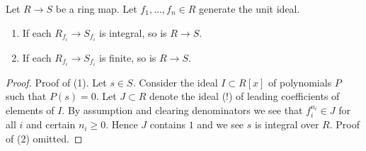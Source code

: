 \begin{lemma}
\label{lemma-integral-local}
Let $R \to S$ be a ring map.
Let $f_1, \ldots, f_n \in R$ generate the unit ideal.
\begin{enumerate}
\item If each $R_{f_i} \to S_{f_i}$ is integral, so is $R \to S$.
\item If each $R_{f_i} \to S_{f_i}$ is finite, so is $R \to S$.
\end{enumerate}
\end{lemma}

\begin{proof}
Proof of (1).
Let $s \in S$. Consider the ideal $I \subset R[x]$ of
polynomials $P$ such that $P(s) = 0$. Let $J \subset R$
denote the ideal (!) of leading coefficients of elements of $I$.
By assumption and clearing denominators
we see that $f_i^{n_i} \in J$ for all $i$
and certain $n_i \geq 0$. Hence $J$ contains $1$ and we see
$s$ is integral over $R$. Proof of (2) omitted.
\end{proof}